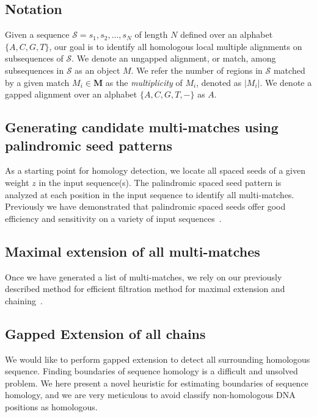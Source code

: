 \documentclass{llncs}
\begin{document}



\subsection{Notation}
Given a sequence $\mathcal{S}=s_1, s_2,\dots, s_N$ of length $N$
defined over an alphabet $\{A,C,G,T\}$, our goal is to identify all homologous
local multiple alignments on subsequences of $\mathcal{S}$. We denote
an ungapped alignment, or match, among subsequences in $\mathcal{S}$
as an object $M$.  We refer the number of regions in $\mathcal{S}$
matched by a given match $M_i \in \mathbf{M}$ as the
\textit{multiplicity} of $M_i$, denoted as $|M_i|$. We denote
a gapped alignment over an alphabet $\{A,C,G,T,-\}$ as $A$.

\subsection{Generating candidate multi-matches using palindromic seed patterns}

As a starting point for homology detection, we locate all spaced seeds of a given weight $z$ in the input sequence(s). The palindromic spaced seed pattern is analyzed at each position in the input sequence to identify all multi-matches.  Previously we have demonstrated that palindromic spaced seeds offer good efficiency and sensitivity on a variety of input sequences~\cite{ref-procrast}.

\subsection{Maximal extension of all multi-matches}

Once we have generated a list of multi-matches, we rely on our previously described method for efficient filtration method for maximal extension and chaining~\cite{ref-procrast}.


\subsection{Gapped Extension of all chains}
We would like to perform gapped
extension to detect all surrounding homologous sequence. Finding boundaries of sequence homology is a difficult and unsolved problem. We here present a novel heuristic for estimating boundaries of sequence homology, and we are very meticulous to avoid classify non-homologous DNA positions as homologous.
\end{document}

